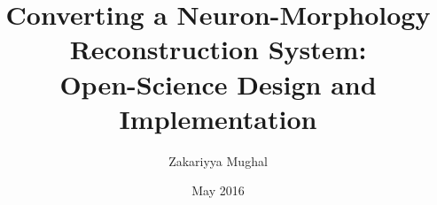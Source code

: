 \title{\bf \large Converting a Neuron-Morphology Reconstruction
System:\\Open-Science Design and Implementation}
\author{Zakariyya Mughal}
\date{May 2016}



